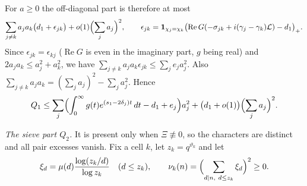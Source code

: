 \documentclass[11pt]{amsart}
\numberwithin{equation}{section}
\theoremstyle{plain}
\theoremstyle{definition}
\theoremstyle{remark}
\newcommand{\LL}{\mathcal{L}}
\renewcommand{\Re}{\operatorname{Re}}
\newcommand{\1}{\mathbf{1}}
\begin{document}
For $a\ge0$ the off-diagonal part is therefore at most
\[
  \sum_{j\ne k}a_ja_k\bigl(d_1+\epsilon_{jk}\bigr)+o(1)\Bigl(\sum_ja_j\Bigr)^2,\qquad
  \epsilon_{jk}=\1_{\chi_j=\chi_k}\bigl(\Re G(-\sigma_{jk}+i(\gamma_j-\gamma_k)\LL)-d_1\bigr)_+ .
\]
Since $\epsilon_{jk}=\epsilon_{kj}$ ($\Re G$ is even in the imaginary part, $g$ being real) and
$2a_ja_k\le a_j^2+a_k^2$, we have $\sum_{j\ne k}a_ja_k\epsilon_{jk}\le\sum_je_ja_j^2$. Also
$\sum_{j\ne k}a_ja_k=(\sum_ja_j)^2-\sum_ja_j^2$. Hence
\begin{equation}\label{eq:Q1}
  Q_1\le\sum_j\Bigl(\int_0^\infty g(t)e^{(s_1-2\delta_j)t}\,dt-d_1+e_j\Bigr)a_j^2
  +\bigl(d_1+o(1)\bigr)\Bigl(\sum_ja_j\Bigr)^2 .
\end{equation}

\emph{The sieve part $Q_2$.} It is present only when $\Xi\not\equiv0$, so the characters are distinct
and all pair excesses vanish. Fix a cell $k$, let $z_k=q^{\vartheta_k}$ and let
\[
  \xi_d=\mu(d)\frac{\log(z_k/d)}{\log z_k}\quad(d\le z_k),\qquad
  \nu_k(n)=\Bigl(\sum_{d\mid n,\ d\le z_k}\xi_d\Bigr)^2\ge0 .
\]
\end{document}
